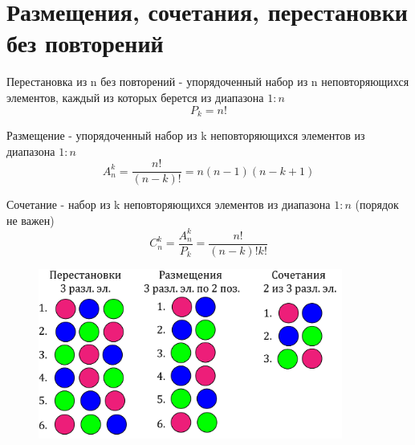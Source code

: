 \documentclass[discrete.tex]{subfiles}
\begin{document}
  \section{Размещения, сочетания, перестановки без повторений}
  
  \begin{definition}
    Перестановка из n без повторений - упорядоченный набор из n неповторяющихся элементов, каждый из которых берется из диапазона $1:n$
    \[P_k = n!\]
  \end{definition}

  \begin{definition}
    Размещение - упорядоченный набор из k неповторяющихся элементов из диапазона $1:n$
    \[A_n^k = \dfrac{n!}{(n-k)!} = n (n-1)(n-k+1)\]
  \end{definition}

  \begin{definition}
    Сочетание - набор из k неповторяющихся элементов из диапазона $1:n$ (порядок не важен)
    \[C_n^k = \frac{A_n^k}{P_k} = \dfrac{n!}{(n-k)! k!}\]
  \end{definition}

  \begin{figure}[H]
      \includegraphics[width=10cm]{pics/5_1.png}
      \centering
  \end{figure}
\end{document}
